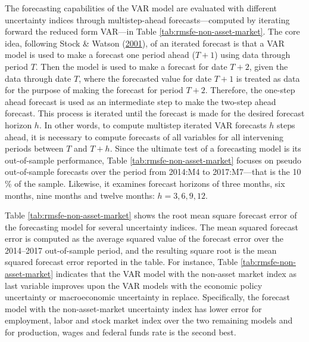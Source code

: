 \documentclass[12pt,twoside]{reedthesis}
\begin{document}
The forecasting capabilities of the VAR model are evaluated with different uncertainty indices through multistep-ahead forecasts---computed by iterating forward the reduced form VAR---in Table \ref{tab:rmsfe-non-asset-market}. The core idea, following Stock \& Watson (\protect\hyperlink{ref-stocwats:2001}{2001}), of an iterated forecast is that a VAR model is used to make a forecast one period ahead (\(T + 1\)) using data through period \(T\). Then the model is used to make a forecast for date \(T + 2\), given the data through date \(T\), where the forecasted value for date \(T + 1\) is treated as data for the purpose of making the forecast for period \(T + 2\). Therefore, the one-step ahead forecast is used as an intermediate step to make the two-step ahead forecast. This process is iterated until the forecast is made for the desired forecast horizon \(h\). In other words, to compute multistep iterated VAR forecasts \(h\) steps ahead, it is necessary to compute forecasts of all variables for all intervening periods between \(T\) and \(T + h\). Since the ultimate test of a forecasting model is its out-of-sample performance, Table \ref{tab:rmsfe-non-asset-market} focuses on pseudo out-of-sample forecasts over the period from 2014:M4 to 2017:M7---that is the 10 \% of the sample. Likewise, it examines forecast horizons of three months, six months, nine months and twelve months: \(h = 3, 6, 9, 12\).

Table \ref{tab:rmsfe-non-asset-market} shows the root mean square forecast error of the forecasting model for several uncertainty indices. The mean squared forecast error is computed as the average squared value of the forecast error over the 2014--2017 out-of-sample period, and the resulting square root is the mean squared forecast error reported in the table. For instance, Table \ref{tab:rmsfe-non-asset-market} indicates that the VAR model with the non-asset market index as last variable improves upon the VAR models with the economic policy uncertainty or macroeconomic uncertainty in replace. Specifically, the forecast model with the non-asset-market uncertainty index has lower error for employment, labor and stock market index over the two remaining models and for production, wages and federal funds rate is the second best.
\end{document}
